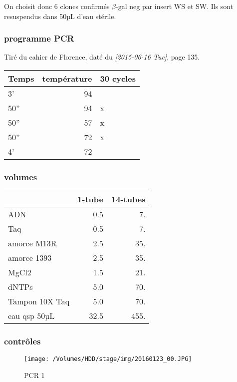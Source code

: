 \documentclass[9pt, oneside, twocolumn]{scrartcl}
\begin{document}
On choisit donc 6 clones confirmés \(\beta\)-gal neg par insert WS et SW. Ils sont
resuspendus dans 50µL d'eau stérile. 

\subsubsection{programme PCR}
\label{sec:orgheadline77}
Tiré du cahier de Florence, daté du \textit{[2015-06-16 Tue]}, page 135. 
\begin{center}
\begin{tabular}{lrl}
\toprule
Temps & température & 30 cycles\\
\midrule
3' & 94 & \\
50'' & 94 & x\\
50'' & 57 & x\\
50'' & 72 & x\\
4' & 72 & \\
\bottomrule
\end{tabular}
\end{center}

\subsubsection{volumes}
\label{sec:orgheadline78}
\begin{center}
\begin{tabular}{lrr}
\toprule
 & 1-tube & 14-tubes\\
\midrule
ADN & 0.5 & 7.\\
Taq & 0.5 & 7.\\
amorce M13R & 2.5 & 35.\\
amorce 1393 & 2.5 & 35.\\
MgCl2 & 1.5 & 21.\\
dNTPs & 5.0 & 70.\\
Tampon 10X Taq & 5.0 & 70.\\
\midrule
eau qsp 50µL & 32.5 & 455.\\
\bottomrule
\end{tabular}
\end{center}

\subsubsection{contrôles}
\label{sec:orgheadline79}
\begin{figure}[htb]
\centering
\texttt{[image: /Volumes/HDD/stage/img/20160123\_00.JPG]}
\caption{PCR 1}
\end{figure}
\end{document}
